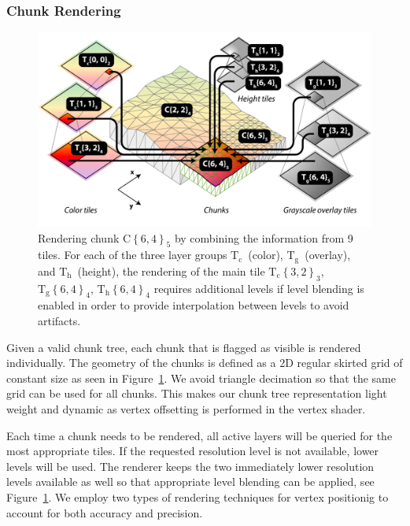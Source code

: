 \documentclass[journal]{vgtc}                %
\newcommand{\kallecomment}[1]{\textbf{[-Kalle-~}
    \textcolor{orange}{#1}
    \textbf{~]}}
\newcommand{\fig}[1]{Figure~\ref{fig:#1}}
\begin{document}

\subsubsection{Chunk Rendering} \label{sec:chunkrendering}
\begin{figure}
  \centering
    \includegraphics[width=1.0\linewidth]{figures/chunks-and-tiles4.pdf}
  \caption{Rendering chunk $\textrm{C}\left\{ 6,4 \right\}_5$ by combining the information from 9 tiles. For each of the three layer groups $\textrm{T}_\textrm{c}$~(color), $\textrm{T}_\textrm{g}$~(overlay), and $\textrm{T}_\textrm{h}$~(height), the rendering of the main tile $\textrm{T}_\textrm{c}\left\{ 3,2 \right\}_3$,  $\textrm{T}_\textrm{g}\left\{ 6,4 \right\}_4$,  $\textrm{T}_\textrm{h}\left\{ 6,4 \right\}_4$ requires additional levels if level blending is enabled in order to provide interpolation between levels to avoid artifacts.}\vspace*{-4mm}
  \label{fig:chunks-and-tiles}
\end{figure}


Given a valid chunk tree, each chunk that is flagged as visible is rendered individually.
The geometry of the chunks is defined as a 2D regular skirted grid of constant size as seen in \fig{chunks-and-tiles}. We avoid triangle decimation so that the same grid can be used for all chunks. This makes our chunk tree representation light weight and dynamic as vertex offsetting is performed in the vertex shader.

Each time a chunk needs to be rendered, all active layers will be queried for the most appropriate tiles.
If the requested resolution level is not available, lower levels will be used.
The renderer keeps the two immediately lower resolution levels available as well so that appropriate level blending can be applied, see \fig{chunks-and-tiles}.
We employ two types of rendering techniques for vertex positionig to account for both accuracy and precision.
\end{document}
